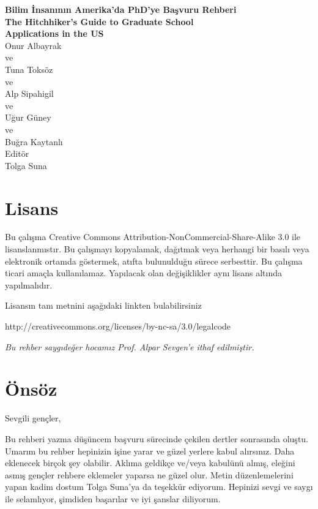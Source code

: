 \documentclass[12pt]{article}
\begin{document}
%
%
\thispagestyle{empty}
\setcounter{page}{0}
\begin{center}
\textbf{\Huge{Bilim İnsanının Amerika'da PhD'ye Başvuru Rehberi} \\
\vspace{8mm}
\Large{The Hitchhiker's Guide to Graduate School \\
\vspace{4mm}
Applications in the US }}\\

\vspace{74mm}
\large{Onur Albayrak}
\\
ve 
\\
Tuna Toksöz 
\\
ve 
\\
Alp Sipahigil 
\\
ve 
\\
Uğur Güney 
\\
ve
\\
Buğra Kaytanlı \\
\vspace{6mm}
\small{
Editör 
\\
Tolga Suna }
\end{center}
%
%
\section*{Lisans}

Bu çalışma Creative Commons Attribution-NonCommercial-Share-Alike 3.0 ile lisanslanmıstır. Bu çalışmayı kopyalamak, dağıtmak veya herhangi bir basılı veya elektronik ortamda göstermek, atıfta bulunulduğu sürece serbesttir. Bu çalışma ticari amaçla kullanılamaz. Yapılacak olan değişiklikler aynı lisans altında yapılmalıdır. 

Lisansın tam metnini aşağıdaki linkten bulabilirsiniz

http://creativecommons.org/licenses/by-nc-sa/3.0/legalcode

\byncsa
\newpage
%
%
\vspace*{45mm} 
\textit{Bu rehber saygıdeğer hocamız Prof. Alpar Sevgen'e ithaf edilmiştir.}
%
\newpage
%
%
\tableofcontents
%
\newpage

%
%
\section{Önsöz}
Sevgili gençler, 

Bu rehberi yazma düşüncem başvuru sürecinde çekilen dertler sonrasında oluştu. Umarım bu rehber hepinizin işine yarar ve güzel yerlere kabul alırsınız. Daha eklenecek birçok şey olabilir. Aklıma geldikçe ve/veya kabulünü almış, eleğini asmış gençler rehbere eklemeler yaparsa ne güzel olur. Metin düzenlemelerini yapan kadim dostum Tolga Suna'ya da teşekkür ediyorum. Hepinizi sevgi ve saygı ile selamlıyor, şimdiden başarılar ve iyi şanslar diliyorum. 
\end{document}
